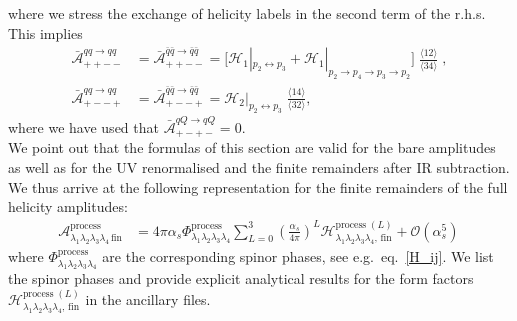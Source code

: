 where we stress the exchange of helicity labels in the second term of the r.h.s.
This implies
\begin{align}
\bar{\mathcal{A}}_{++--}^{\scriptstyle q q \rightarrow q q} &=\bar{\mathcal{A}}_{++--}^{\scriptstyle \bar q \bar q \rightarrow \bar q \bar q} = \Big[ \mathcal{H}_1|_{p_2 \leftrightarrow p_3}  + \mathcal{H}_1|_{p_2 \rightarrow p_4 \rightarrow p_3 \rightarrow p_2}   \Big]  \; \frac{ \langle 12 \rangle}{\langle 34 \rangle}  \;,  \label{t_equal_quarks_1}\\[8pt]
\bar{\mathcal{A}}_{+--+}^{\scriptstyle qq \rightarrow q q} &=\bar{\mathcal{A}}_{+--+}^{\scriptstyle \bar q\bar q \rightarrow \bar q \bar q} = \mathcal{H}_2|_{p_2 \leftrightarrow p_3} \; \frac{ \langle 14 \rangle}{\langle 32 \rangle} , \label{t_equal_quarks_2}
\end{align}
where we have used that $\bar{\mathcal{A}}^{\scriptstyle qQ\rightarrow qQ}_{{+-+-}}=0$.\\

We point out that the formulas of this section are valid for the bare amplitudes as well as for the UV renormalised and the finite remainders after IR subtraction.
We thus arrive at the following representation for the finite remainders of the full helicity amplitudes:
\begin{align}
    \mathcal{A}^{\text{process}}_{\lambda_1\lambda_2\lambda_3\lambda_4\,\text{fin}}
    &= 4 \pi \alpha_s \Phi^{\text{process}}_{\lambda_1\lambda_2\lambda_3\lambda_4}
    \sum_{L=0}^3 \left(\frac{\alpha_s}{4\pi}\right)^L \mathcal{H}^{\text{process}\;(L)}_{\lambda_1\lambda_2\lambda_3\lambda_4,\,\text{fin}} 
    + \mathcal{O}(\alpha_s^5)\,
\end{align}
where $\Phi^{\text{process}}_{\lambda_1\lambda_2\lambda_3\lambda_4}$ are the corresponding spinor phases, see e.g.\ eq.~\eqref{H_ij}.
We list the spinor phases and provide explicit analytical results for the form factors $\mathcal{H}^{\text{process}\;(L)}_{\lambda_1\lambda_2\lambda_3\lambda_4,\,\text{fin}}$ in the ancillary files.
